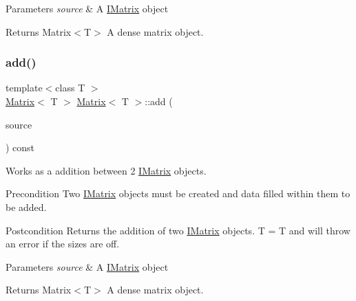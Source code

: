 \begin{DoxyParams}{Parameters}
{\em source} & A \mbox{\hyperlink{class_i_matrix}{I\+Matrix}} object \\
\hline
\end{DoxyParams}
\begin{DoxyReturn}{Returns}
Matrix$<$\+T$>$ A dense matrix object. 
\end{DoxyReturn}
\mbox{\label{class_matrix_adcc8d1f307ef187dcec103cf3273ae6a}} 
\subsubsection{\texorpdfstring{add()}{add()}\hspace{0.1cm}{\footnotesize\ttfamily [4/6]}}
{\footnotesize\ttfamily template$<$class T $>$ \\
\mbox{\hyperlink{class_matrix}{Matrix}}$<$ T $>$ \mbox{\hyperlink{class_matrix}{Matrix}}$<$ T $>$\+::add (\begin{DoxyParamCaption}\item[{const \mbox{\hyperlink{class_i_matrix}{I\+Matrix}}$<$ \mbox{\hyperlink{class_u_matrix}{U\+Matrix}}$<$ T $>$, T $>$ \&}]{source }\end{DoxyParamCaption}) const}



Works as a addition between 2 \mbox{\hyperlink{class_i_matrix}{I\+Matrix}} objects. 

\begin{DoxyPrecond}{Precondition}
Two \mbox{\hyperlink{class_i_matrix}{I\+Matrix}} objects must be created and data filled within them to be added. 
\end{DoxyPrecond}
\begin{DoxyPostcond}{Postcondition}
Returns the addition of two \mbox{\hyperlink{class_i_matrix}{I\+Matrix}} objects. T = T and will throw an error if the sizes are off.
\end{DoxyPostcond}

\begin{DoxyParams}{Parameters}
{\em source} & A \mbox{\hyperlink{class_i_matrix}{I\+Matrix}} object \\
\hline
\end{DoxyParams}
\begin{DoxyReturn}{Returns}
Matrix$<$\+T$>$ A dense matrix object. 
\end{DoxyReturn}
\mbox{\label{class_matrix_a95b11bcadf40ded8ff18d2a61ab082c6}} 
